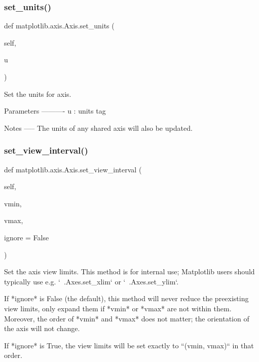 \subsubsection{\texorpdfstring{set\+\_\+units()}{set\_units()}}
{\footnotesize\ttfamily def matplotlib.\+axis.\+Axis.\+set\+\_\+units (\begin{DoxyParamCaption}\item[{}]{self,  }\item[{}]{u }\end{DoxyParamCaption})}

\begin{DoxyVerb}Set the units for axis.

Parameters
----------
u : units tag

Notes
-----
The units of any shared axis will also be updated.
\end{DoxyVerb}
 \mbox{\label{classmatplotlib_1_1axis_1_1Axis_ab8e23f58bc8d65f09c7d519c4b0925a1}} 
\subsubsection{\texorpdfstring{set\+\_\+view\+\_\+interval()}{set\_view\_interval()}}
{\footnotesize\ttfamily def matplotlib.\+axis.\+Axis.\+set\+\_\+view\+\_\+interval (\begin{DoxyParamCaption}\item[{}]{self,  }\item[{}]{vmin,  }\item[{}]{vmax,  }\item[{}]{ignore = {\ttfamily False} }\end{DoxyParamCaption})}

\begin{DoxyVerb}Set the axis view limits.  This method is for internal use; Matplotlib
users should typically use e.g. `~.Axes.set_xlim` or `~.Axes.set_ylim`.

If *ignore* is False (the default), this method will never reduce the
preexisting view limits, only expand them if *vmin* or *vmax* are not
within them.  Moreover, the order of *vmin* and *vmax* does not matter;
the orientation of the axis will not change.

If *ignore* is True, the view limits will be set exactly to ``(vmin,
vmax)`` in that order.
\end{DoxyVerb}
 \mbox{\label{classmatplotlib_1_1axis_1_1Axis_a1cf98f6edcd003fccaf91ba7fbb21cc4}} 
